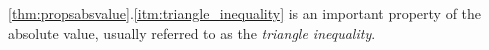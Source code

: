 \documentclass[../notes.tex]{subfiles}
\begin{document}

\ref{thm:propsabsvalue}.\ref{itm:triangle_inequality} is an important property of the absolute value, usually referred to as the \textit{triangle inequality}. 
\end{document}

